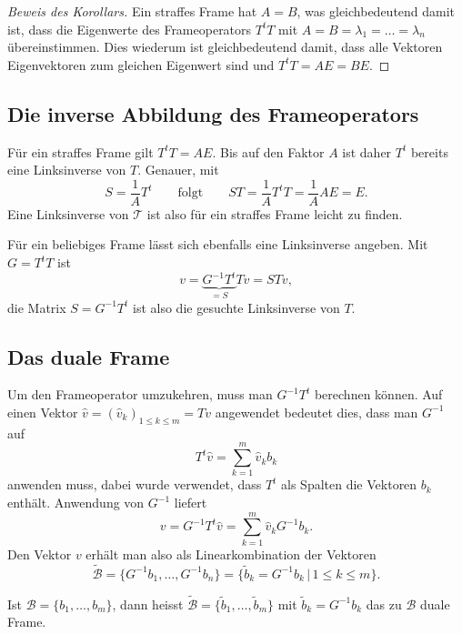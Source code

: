 \begin{proof}[Beweis des Korollars]
Ein straffes Frame hat $A=B$, was gleichbedeutend damit ist, dass
die Eigenwerte des Frameoperators $T^tT$ mit 
$A=B=\lambda_1=\dots=\lambda_n$ übereinstimmen.
Dies wiederum ist gleichbedeutend damit, dass alle Vektoren Eigenvektoren
zum gleichen Eigenwert sind und $T^tT=AE=BE$.
\end{proof}

\subsection{Die inverse Abbildung des Frameoperators}
Für ein straffes Frame gilt $T^tT  = AE$.
Bis auf den Faktor $A$ ist daher $T^t$ bereits eine Linksinverse von $T$.
Genauer, mit
\[
S=\frac1{A} T^t
\qquad\text{folgt}\qquad
ST
=
\frac1{A} T^tT
=
\frac1{A} AE
=
E.
\]
Eine Linksinverse von $\mathcal{T}$ ist also für ein straffes Frame
leicht zu finden.

Für ein beliebiges Frame lässt sich ebenfalls eine Linksinverse angeben.
Mit $G=T^tT$ ist
\[
v
=
\underbrace{G^{-1}T^t}_{\displaystyle=S}Tv
=
STv,
\]
die Matrix $S=G^{-1}T^t$ ist also die gesuchte Linksinverse von $T$.

\subsection{Das duale Frame}
Um den Frameoperator umzukehren, muss man $G^{-1}T^t$ berechnen
können.
Auf einen Vektor $\hat{v} = (\hat{v}_k)_{1\le k\le m} = Tv$ angewendet
bedeutet dies, dass man $G^{-1}$ auf
\[
T^t \hat{v} = \sum_{k=1}^m \hat{v}_k  b_k
\]
anwenden muss, dabei wurde verwendet, dass $T^t$ als Spalten die
Vektoren $b_k$ enthält.
Anwendung von $G^{-1}$ liefert
\[
v
=
G^{-1} T^t \hat{v}
=
\sum_{k=1}^m \hat{v}_k G^{-1}b_k.
\]
Den Vektor $v$ erhält man also als Linearkombination der Vektoren
\[
\tilde{\mathcal{B}}
=
\{ G^{-1}b_1,\dots,G^{-1}b_n\}
=
\{ \tilde{b}_k = G^{-1}b_k\,|\, 1\le k\le m\}.
\]

\begin{definition}
\label{definition:dualesframe}
Ist $\mathcal{B}=\{b_1,\dots,b_m\}$, dann heisst
$\tilde{\mathcal{B}} = \{\tilde{b}_1,\dots,\tilde{b}_m\}$ 
mit
$\tilde{b}_k=G^{-1} b_k$
das zu $\mathcal{B}$ duale Frame.
\end{definition}

